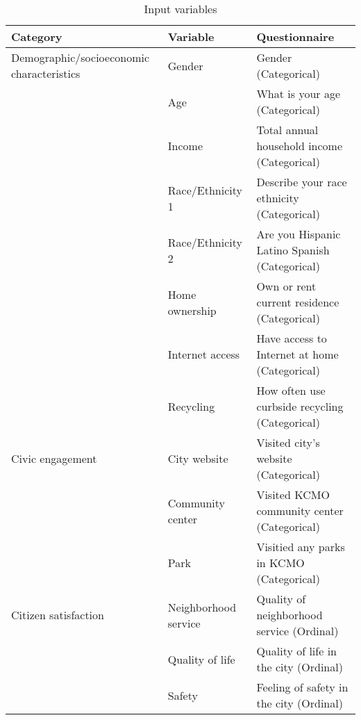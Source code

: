 \begin{table}[]
\centering
\begin{tabular}{@{}lll@{}}
\toprule
\textbf{Category} & \textbf{Variable} & \textbf{Questionnaire}                         \\ \midrule
Demographic/socioeconomic characteristics & Gender               & Gender (Categorical)                      \\
                  & Age               & What is your age (Categorical)                 \\
                  & Income            & Total annual household income (Categorical)    \\
                  & Race/Ethnicity 1  & Describe your race ethnicity (Categorical)     \\
                  & Race/Ethnicity 2  & Are you Hispanic Latino Spanish (Categorical)  \\
                  & Home ownership    & Own or rent current residence (Categorical)    \\
                  & Internet access   & Have access to Internet at home (Categorical)  \\
                  & Recycling         & How often use curbside recycling (Categorical) \\
Civic engagement                          & City website         & Visited city's website (Categorical)      \\
                  & Community center  & Visited KCMO community center (Categorical)    \\
                  & Park              & Visitied any parks in KCMO (Categorical)       \\
Citizen satisfaction                      & Neighborhood service & Quality of neighborhood service (Ordinal) \\
                  & Quality of life   & Quality of life in the city (Ordinal)          \\
                  & Safety            & Feeling of safety in the city (Ordinal)        \\ \bottomrule
\end{tabular}
\caption{Input variables}
\label{tab:variables}
\end{table}